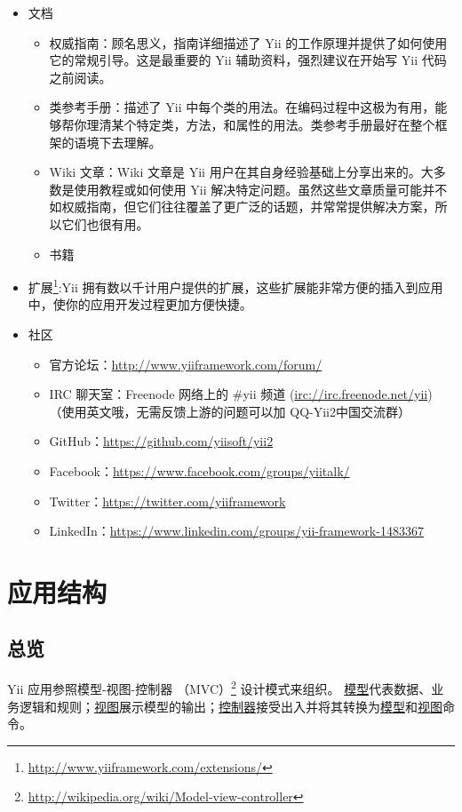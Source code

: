\begin{itemize}
\item 文档\begin{itemize}
\item 权威指南：顾名思义，指南详细描述了 Yii 的工作原理并提供了如何使用它的常规引导。这是最重要的 Yii 辅助资料，强烈建议在开始写 Yii 代码之前阅读。
\item 类参考手册：描述了 Yii 中每个类的用法。在编码过程中这极为有用，能够帮你理清某个特定类，方法，和属性的用法。类参考手册最好在整个框架的语境下去理解。
\item Wiki 文章：Wiki 文章是 Yii 用户在其自身经验基础上分享出来的。大多数是使用教程或如何使用 Yii 解决特定问题。虽然这些文章质量可能并不如权威指南，但它们往往覆盖了更广泛的话题，并常常提供解决方案，所以它们也很有用。
\item 书籍
\end{itemize}

\item 扩展\footnote{\url{http://www.yiiframework.com/extensions/}}:Yii 拥有数以千计用户提供的扩展，这些扩展能非常方便的插入到应用中，使你的应用开发过程更加方便快捷。
\item 社区\begin{itemize}
\item 官方论坛：\url{http://www.yiiframework.com/forum/}
\item IRC 聊天室：Freenode 网络上的 \#yii 频道 (\url{irc://irc.freenode.net/yii})（使用英文哦，无需反馈上游的问题可以加 
QQ-Yii2中国交流群）
\item GitHub：\url{https://github.com/yiisoft/yii2}
\item Facebook：\url{https://www.facebook.com/groups/yiitalk/}
\item Twitter：\url{https://twitter.com/yiiframework}
\item LinkedIn：\url{https://www.linkedin.com/groups/yii-framework-1483367}
\end{itemize}

\end{itemize}


\chapter{应用结构}
\label{structure-overview.md}\section{总览}
Yii 应用参照模型-视图-控制器 （MVC）\footnote{\url{http://wikipedia.org/wiki/Model-view-controller}}
 设计模式来组织。 \hyperref[structure-models.md]{模型}代表数据、业务逻辑和规则；\hyperref[structure-views.md]{视图}展示模型的输出；\hyperref[structure-controllers.md]{控制器}接受出入并将其转换为\hyperref[structure-models.md]{模型}和\hyperref[structure-views.md]{视图}命令。

